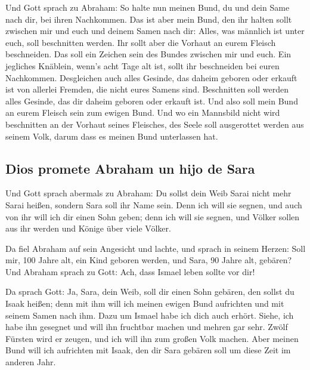  Und Gott sprach zu Abraham: So halte nun meinen Bund, du
und dein Same nach dir, bei ihren Nachkommen.  Das ist
aber mein Bund, den ihr halten sollt zwischen mir und euch und deinem
Samen nach dir: Alles, was männlich ist unter euch, soll beschnitten
werden.  Ihr sollt aber die Vorhaut an eurem Fleisch
beschneiden. Das soll ein Zeichen sein des Bundes zwischen mir und euch.
 Ein jegliches Knäblein, wenn's acht Tage alt ist, sollt
ihr beschneiden bei euren Nachkommen. Desgleichen auch alles Gesinde,
das daheim geboren oder erkauft ist von allerlei Fremden, die nicht
eures Samens sind.  Beschnitten soll werden alles
Gesinde, das dir daheim geboren oder erkauft ist. Und also soll mein
Bund an eurem Fleisch sein zum ewigen Bund.  Und wo ein
Mannsbild nicht wird beschnitten an der Vorhaut seines Fleisches, des
Seele soll ausgerottet werden aus seinem Volk, darum dass es meinen Bund
unterlassen hat.

\hypertarget{dios-promete-abraham-un-hijo-de-sara}{%
\subsection{Dios promete Abraham un hijo de
Sara}\label{dios-promete-abraham-un-hijo-de-sara}}

 Und Gott sprach abermals zu Abraham: Du sollst dein Weib
Sarai nicht mehr Sarai heißen, sondern Sara soll ihr Name sein.
 Denn ich will sie segnen, und auch von ihr will ich dir
einen Sohn geben; denn ich will sie segnen, und Völker sollen aus ihr
werden und Könige über viele Völker.

 Da fiel Abraham auf sein Angesicht und lachte, und
sprach in seinem Herzen: Soll mir, 100 Jahre alt, ein Kind geboren
werden, und Sara, 90 Jahre alt, gebären?  Und Abraham
sprach zu Gott: Ach, dass Ismael leben sollte vor dir!

 Da sprach Gott: Ja, Sara, dein Weib, soll dir einen Sohn
gebären, den sollst du Isaak heißen; denn mit ihm will ich meinen ewigen
Bund aufrichten und mit seinem Samen nach ihm.  Dazu um
Ismael habe ich dich auch erhört. Siehe, ich habe ihn gesegnet und will
ihn fruchtbar machen und mehren gar sehr. Zwölf Fürsten wird er zeugen,
und ich will ihn zum großen Volk machen.  Aber meinen
Bund will ich aufrichten mit Isaak, den dir Sara gebären soll um diese
Zeit im anderen Jahr.

